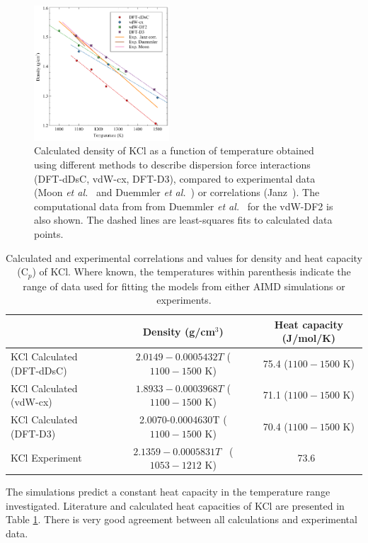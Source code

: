 \documentclass[preprint,3p,10pt,number,sort&compress]{elsarticle}
\begin{document}
\begin{figure}[h!]
\centering
\includegraphics[width=0.45\textwidth]{ben_fig1.pdf}
\caption{Calculated density of KCl as a function of temperature obtained using different methods to describe dispersion force interactions (DFT-dDsC, vdW-cx, DFT-D3), compared to experimental data (Moon \textit{et al.}~\cite{Moon} and Duemmler \textit{et al.}~\cite{DUEMMLER2022153414}) or correlations (Janz~\cite{Janz1988}). The computational data from 
from Duemmler \textit{et al.}~\cite{DUEMMLER2022153414} for the vdW-DF2 is also shown. The dashed lines are least-squares fits to calculated data points.} 
\label{fig:KCl}
\end{figure}

\begin{table}[hb!]
\centering
\caption{Calculated and experimental correlations and values for density and heat capacity (C$_p$) of KCl. Where known, the temperatures within parenthesis indicate the range of data used for fitting the models from either AIMD simulations or experiments.}
\begin{tabular}{lcc}
\hline
\hline
& Density (g/cm$^3$) &Heat capacity (J/mol/K) \\
\hline
KCl Calculated (DFT-dDsC)	&$2.0149-0.0005432T$ ($1100 - 1500$ K) &75.4 ($1100 - 1500$ K)\\
KCl Calculated (vdW-cx)	& $1.8933-0.0003968T$ ($1100 - 1500$ K)& 71.1 ($1100 - 1500$ K)\\
KCl Calculated (DFT-D3)	&2.0070-0.0004630T ($1100 - 1500$ K)& 70.4 ($1100 - 1500$ K)\\
KCl Experiment	&$2.1359-0.0005831 T$~\cite{Janz1988} ($1053-1212$ K) &73.6~\cite{NIST} \\	
\hline
\hline
\end{tabular}
\label{table:KCldensityetc}
\end{table}

The simulations predict a constant heat capacity in the temperature range investigated. Literature and calculated heat capacities of KCl are presented in Table \ref{table:KCldensityetc}. There is very good agreement between all calculations and experimental data. 
\end{document}
